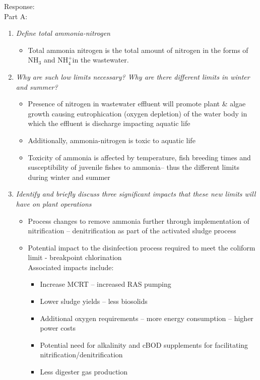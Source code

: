 \begin{enumerate}
Response:\\
Part A:\\
\begin{enumerate}[label=\alph*]
\item \textit{Define total ammonia-nitrogen}
\begin{itemize}
\item Total ammonia nitrogen is the total amount of nitrogen in the forms of NH$_3$ and NH$_4^+$in the wastewater.
\end{itemize}
\item \textit{Why are such low limits necessary? Why are there different limits in winter and summer?}
\begin{itemize}
\item Presence of nitrogen in wastewater effluent will promote plant \& algae growth causing eutrophication (oxygen depletion) of the water body in which the effluent is discharge impacting aquatic life
\item Additionally, ammonia-nitrogen is toxic to aquatic life
\item Toxicity of ammonia is affected by temperature, fish breeding times and susceptibility of juvenile fishes to ammonia– thus the different limits during winter and summer
\end{itemize}
\item \textit{Identify and briefly discuss three significant impacts that these new limits will have on plant operations}
\begin{itemize}
\item Process changes to remove ammonia further through implementation of nitrification – denitrification as part of the activated sludge process
\item Potential impact to the disinfection process required to meet the coliform limit - breakpoint chlorination\\
Associated impacts include:  
\begin{itemize}
\item Increase MCRT – increased RAS pumping
\item Lower sludge yields – less biosolids
\item Additional oxygen requirements – more energy consumption – higher power costs
\item Potential need for alkalinity and cBOD supplements for facilitating nitrification/denitrification
\item Less digester gas production
\end{itemize}
\end{itemize}	

\end{enumerate}
\end{enumerate}
